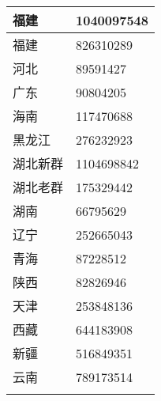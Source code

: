 {\begin{tabular}[t]{|w{c}{4em}|w{c}{6em}|}
        \hline
        福建   & 1040097548                \\
        \hline
        福建   & 826310289                 \\
        \hline
        河北   & 89591427                  \\
        \hline
        广东   & 90804205                  \\
        \hline
        海南   & 117470688                 \\
        \hline
        黑龙江  & 276232923                 \\
        \hline
        湖北新群 & 1104698842                \\
        \hline
        湖北老群 & 175329442                 \\
        \hline
        湖南   & 66795629                  \\
        \hline
        辽宁   & 252665043                 \\
        \hline
        青海   & 87228512                  \\
        \hline
        陕西   & 82826946                  \\
        \hline
        天津   & 253848136                 \\
        \hline
        西藏   & 644183908                 \\
        \hline
        新疆   & 516849351                 \\
        \hline
        云南   & 789173514                 \\
        \Xhline{1.2pt}
    \end{tabular}%
}

\newpage